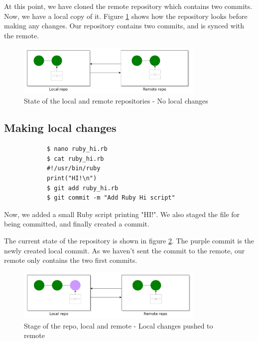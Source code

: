 \documentclass[../main/git_course_main.tex]{subfiles}
\begin{document}
	At this point, we have cloned the remote repository which contains two commits. Now, we have a local copy of it.
	Figure \ref{fig:original_state} shows how the repository looks before making any changes. Our repository contains two commits, and is synced with the remote.
	
	\begin{figure}[h!]
		\centering
		\includegraphics[width=0.8\textwidth]{../visualizations/chapter5/530_local_remote_synced.pdf}
		\caption{State of the local and remote repositories - No local changes}
		\label{fig:original_state}
	\end{figure}
	
	\subsection{Making local changes}
	
	\begin{codebox}
		\begin{lstlisting}
			$ nano ruby_hi.rb
			$ cat ruby_hi.rb
			#!/usr/bin/ruby
			print("HI!\n")
			$ git add ruby_hi.rb
			$ git commit -m "Add Ruby Hi script"
		\end{lstlisting}
	\end{codebox}
	
	Now, we added a small Ruby script printing "HI!". We also staged the file for being committed, and finally created a commit.
	
	The current state of the repository is shown in figure \ref{fig:local_changes}. The purple commit is the newly created local commit. As we haven't sent the commit to the remote, our remote only contains the two first commits.
	
	\begin{figure}[h!]
		\centering
		\includegraphics[width=0.8\textwidth]{../visualizations/chapter5/53_local_changes_made.pdf}
		\caption{Stage of the repo, local and remote - Local changes pushed to remote}
		\label{fig:local_changes}
	\end{figure}
	
\end{document}
